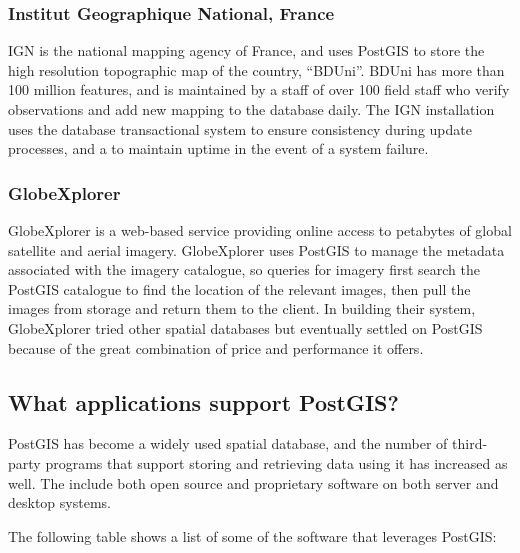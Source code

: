 \documentclass[a4paper,11pt,english]{sphinxmanual}
\begin{document}
\subsubsection{Institut Geographique National, France}
\label{\detokenize{introduction:institut-geographique-national-france}}
IGN is the national mapping agency of France, and uses PostGIS to store the high resolution topographic map of the country, “BDUni”. BDUni has more than 100 million features, and is maintained by a staff of over 100 field staff who verify observations and add new mapping to the database daily. The IGN installation uses the database transactional system to ensure consistency during update processes, and a  to maintain uptime in the event of a system failure.


\subsubsection{GlobeXplorer}
\label{\detokenize{introduction:globexplorer}}
GlobeXplorer is a web-based service providing online access to petabytes of global satellite and aerial imagery. GlobeXplorer uses PostGIS to manage the metadata associated with the imagery catalogue, so queries for imagery first search the PostGIS catalogue to find the location of the relevant images, then pull the images from storage and return them to the client. In building their system, GlobeXplorer tried other spatial databases but eventually settled on PostGIS because of the great combination of price and performance it offers.


\subsection{What applications support PostGIS?}
\label{\detokenize{introduction:what-applications-support-postgis}}
PostGIS has become a widely used spatial database, and the number of third-party programs that support storing and retrieving data using it has increased as well. The  include both open source and proprietary software on both server and desktop systems.

The following table shows a list of some of the software that leverages PostGIS:
\end{document}
